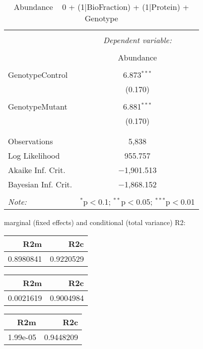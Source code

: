 \documentclass[11pt]{report}
\begin{document}
\begin{table}[!htbp] \centering 
  \caption{Abundance ~ 0 + (1|BioFraction) + (1|Protein) + Genotype} 
  \label{} 
\begin{tabular}{@{\extracolsep{5pt}}lc} 
\\[-1.8ex]\hline 
\hline \\[-1.8ex] 
 & \multicolumn{1}{c}{\textit{Dependent variable:}} \\ 
\cline{2-2} 
\\[-1.8ex] & Abundance \\ 
\hline \\[-1.8ex] 
 GenotypeControl & 6.873$^{***}$ \\ 
  & (0.170) \\ 
  & \\ 
 GenotypeMutant & 6.881$^{***}$ \\ 
  & (0.170) \\ 
  & \\ 
\hline \\[-1.8ex] 
Observations & 5,838 \\ 
Log Likelihood & 955.757 \\ 
Akaike Inf. Crit. & $-$1,901.513 \\ 
Bayesian Inf. Crit. & $-$1,868.152 \\ 
\hline 
\hline \\[-1.8ex] 
\textit{Note:}  & \multicolumn{1}{r}{$^{*}$p$<$0.1; $^{**}$p$<$0.05; $^{***}$p$<$0.01} \\ 
\end{tabular} 
\end{table} 
marginal (fixed effects) and conditional (total variance) R2:

\begin{tabular}{r|r}
\hline
R2m & R2c\\
\hline
0.8980841 & 0.9220529\\
\hline
\end{tabular}

\begin{tabular}{r|r}
\hline
R2m & R2c\\
\hline
0.0021619 & 0.9004984\\
\hline
\end{tabular}

\begin{tabular}{r|r}
\hline
R2m & R2c\\
\hline
1.99e-05 & 0.9448209\\
\hline
\end{tabular}
\end{document}

